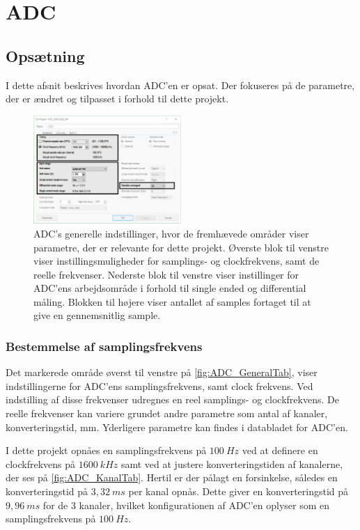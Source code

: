 \chapter{ADC} \label{sec:ADC_bilag}
\section{Opsætning}
I dette afsnit beskrives hvordan ADC'en er opsat. Der fokuseres på de parametre, der er ændret og tilpasset i forhold til dette projekt.

\begin{figure}[H]
	\centering
	\includegraphics[width=0.5\textwidth]{figures/ADC_instillinger_edit.png}
	\caption{ADC's generelle indstillinger, hvor de fremhævede områder viser parametre, der er relevante for dette projekt. Øverste blok til venstre viser instillingsmuligheder for samplings- og clockfrekvens, samt de reelle frekvenser. Nederste blok til venstre viser instillinger for ADC'ens arbejdsområde i forhold til single ended og differential måling. Blokken til højere viser antallet af samples fortaget til at give en gennemsnitlig sample.}
	\label{fig:ADC_GeneralTab}
\end{figure}

\subsection{Bestemmelse af samplingsfrekvens}
Det markerede område øverst til venstre på \autoref{fig:ADC_GeneralTab}, viser indstillingerne for ADC'ens samplingsfrekvens, samt clock frekvens. Ved indstilling af disse frekvenser udregnes en reel samplings- og clockfrekvens. De reelle frekvenser kan variere grundet andre parametre som antal af kanaler, konverteringstid, mm. Yderligere parametre kan findes i databladet for ADC'en. 

I dette projekt opnåes en samplingsfrekvens på $100~Hz$ ved at definere en clockfrekvens på $1600~kHz$ samt ved at justere konverteringstiden af kanalerne, der ses på \autoref{fig:ADC_KanalTab}. Hertil er der pålagt en forsinkelse, således en konverteringstid på $3,32~ms$ per kanal opnås. Dette giver en konverteringstid på $9,96~ms$ for de 3 kanaler, hvilket konfigurationen af ADC'en oplyser som en samplingsfrekvens på $100~Hz$. 

